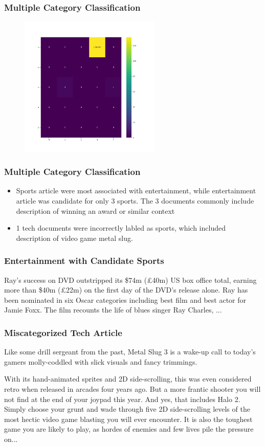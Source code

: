 \documentclass[
  10pt %
  16:9, %
]{beamer}
\begin{document}
\begin{frame}
  \frametitle{Multiple Category Classification}
  \begin{figure}
    \centering
    \includegraphics[width=0.6\textwidth]{candidate_relation.png}
  \end{figure}
\end{frame}

\begin{frame}
  \frametitle{Multiple Category Classification}
  \begin{itemize}
    \item Sports article were most associated with entertainment, while entertainment article was candidate for only 3 sports. The 3 documents commonly include description of winning an award or similar context
    \item 1 tech documents were incorrectly labled as sports, which included description of video game metal slug.
  \end{itemize}
\end{frame}

\begin{frame}
  \frametitle{Entertainment with Candidate Sports}

Ray's success on DVD outstripped its \$74m (£40m) US box office total, earning more than \$40m (£22m) on the first day of the DVD's release alone. Ray has been nominated in six Oscar categories including best film and best actor for Jamie Foxx. The film recounts the life of blues singer Ray Charles, ...
\end{frame}

\begin{frame}
  \frametitle{Miscategorized Tech Article}
Like some drill sergeant from the past, Metal Slug 3 is a wake-up call to today's gamers molly-coddled with slick visuals and fancy trimmings.

With its hand-animated sprites and 2D side-scrolling, this was even considered retro when released in arcades four years ago. But a more frantic shooter you will not find at the end of your joypad this year. And yes, that includes Halo 2. Simply choose your grunt and wade through five 2D side-scrolling levels of the most hectic video game blasting you will ever encounter. It is also the toughest game you are likely to play, as hordes of enemies and few lives pile the pressure on...
\end{frame}
\end{document}
